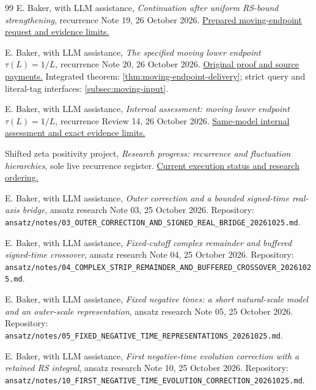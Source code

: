 \begin{thebibliography}{99}
E. Baker, with LLM assistance,
\emph{Continuation after uniform RS-bound strengthening},
recurrence Note 19, 26 October 2026.
\href{run:../../../papers/investigations-5/01_heat_density_asymptotics/recurrence/notes/19_ANALYTICAL_CONTINUATION_AFTER_RS_BOUNDS_20261026.md}{Prepared moving-endpoint request and evidence limits.}

E. Baker, with LLM assistance,
\emph{The specified moving lower endpoint \(\tau(L)=1/L\)},
recurrence Note 20, 26 October 2026.
\href{run:../../../papers/investigations-5/01_heat_density_asymptotics/recurrence/notes/20_MOVING_LOWER_ENDPOINT_20261026.md}{Original proof and source payments.}
Integrated theorem: \cref{thm:moving-endpoint-delivery}; strict query and
literal-tag interfaces: \cref{subsec:moving-input}.

E. Baker, with LLM assistance,
\emph{Internal assessment: moving lower endpoint \(\tau(L)=1/L\)},
recurrence Review 14, 26 October 2026.
\href{run:../../../papers/investigations-5/01_heat_density_asymptotics/recurrence/reviews/14_MOVING_ENDPOINT_ASSESSMENT_20261026.md}{Same-model internal assessment and exact evidence limits.}

Shifted zeta positivity project,
\emph{Research progress: recurrence and fluctuation hierarchies},
sole live recurrence register.
\href{run:../../../papers/investigations-5/01_heat_density_asymptotics/recurrence/research-progress/01_RECURRENCE_RESEARCH_PROGRESS_20261026.md}{Current execution status and research ordering.}

E. Baker, with LLM assistance,
\emph{Outer correction and a bounded signed-time real-axis bridge},
ansatz research Note 03, 25 October 2026.
Repository: \nolinkurl{ansatz/notes/03_OUTER_CORRECTION_AND_SIGNED_REAL_BRIDGE_20261025.md}.

E. Baker, with LLM assistance,
\emph{Fixed-cutoff complex remainder and buffered signed-time crossover},
ansatz research Note 04, 25 October 2026.
Repository: \nolinkurl{ansatz/notes/04_COMPLEX_STRIP_REMAINDER_AND_BUFFERED_CROSSOVER_20261025.md}.

E. Baker, with LLM assistance,
\emph{Fixed negative times: a short natural-scale model and an outer-scale representation},
ansatz research Note 05, 25 October 2026.
Repository: \nolinkurl{ansatz/notes/05_FIXED_NEGATIVE_TIME_REPRESENTATIONS_20261025.md}.

E. Baker, with LLM assistance,
\emph{First negative-time evolution correction with a retained RS integral},
ansatz research Note 10, 25 October 2026.
Repository: \nolinkurl{ansatz/notes/10_FIRST_NEGATIVE_TIME_EVOLUTION_CORRECTION_20261025.md}.


\end{thebibliography}
